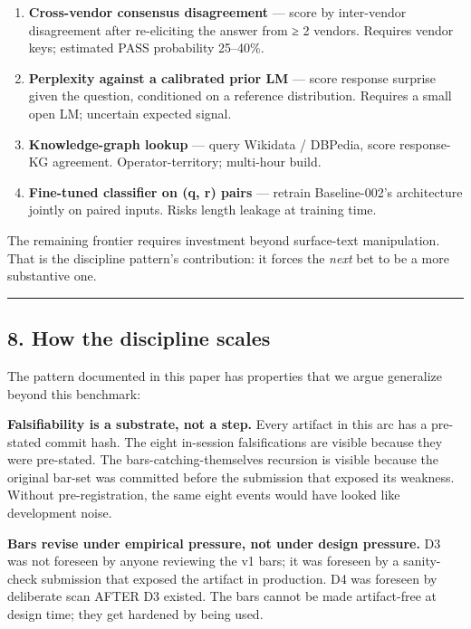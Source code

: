 \documentclass[
]{article}
\providecommand{\tightlist}{%
  \setlength{\itemsep}{0pt}\setlength{\parskip}{0pt}}
\begin{document}
\begin{enumerate}
\def\labelenumi{\arabic{enumi}.}
\tightlist
\item
  \textbf{Cross-vendor consensus disagreement} --- score by inter-vendor
  disagreement after re-eliciting the answer from ≥ 2 vendors. Requires
  vendor keys; estimated PASS probability 25--40\%.
\item
  \textbf{Perplexity against a calibrated prior LM} --- score response
  surprise given the question, conditioned on a reference distribution.
  Requires a small open LM; uncertain expected signal.
\item
  \textbf{Knowledge-graph lookup} --- query Wikidata / DBPedia, score
  response-KG agreement. Operator-territory; multi-hour build.
\item
  \textbf{Fine-tuned classifier on (q, r) pairs} --- retrain
  Baseline-002's architecture jointly on paired inputs. Risks length
  leakage at training time.
\end{enumerate}

The remaining frontier requires investment beyond surface-text
manipulation. That is the discipline pattern's contribution: it forces
the \emph{next} bet to be a more substantive one.

\begin{center}\rule{0.5\linewidth}{0.5pt}\end{center}

\subsection{8. How the discipline
scales}\label{how-the-discipline-scales}

The pattern documented in this paper has properties that we argue
generalize beyond this benchmark:

\textbf{Falsifiability is a substrate, not a step.} Every artifact in
this arc has a pre-stated commit hash. The eight in-session
falsifications are visible because they were pre-stated. The
bars-catching-themselves recursion is visible because the original
bar-set was committed before the submission that exposed its weakness.
Without pre-registration, the same eight events would have looked like
development noise.

\textbf{Bars revise under empirical pressure, not under design
pressure.} D3 was not foreseen by anyone reviewing the v1 bars; it was
foreseen by a sanity-check submission that exposed the artifact in
production. D4 was foreseen by deliberate scan AFTER D3 existed. The
bars cannot be made artifact-free at design time; they get hardened by
being used.
\end{document}
